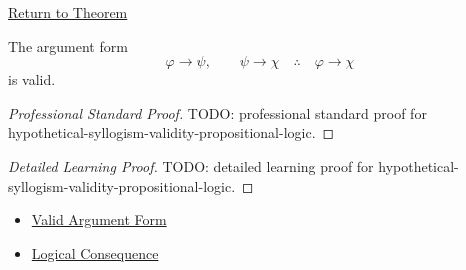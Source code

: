 \newpage
{}
\label{prf:hypothetical-syllogism-validity-propositional-logic}

\begin{remark*}[Return]
\hyperref[thm:hypothetical-syllogism-validity-propositional-logic]{Return to Theorem}
\end{remark*}

\begin{theorem*}
The argument form
\[
\varphi\to\psi,\qquad \psi\to\chi \quad\therefore\quad \varphi\to\chi
\]
is valid.
\end{theorem*}

\begin{proof}[Professional Standard Proof]
\LRAProofBodyStart
TODO: professional standard proof for hypothetical-syllogism-validity-propositional-logic.
\end{proof}

\begin{proof}[Detailed Learning Proof]
\LRAProofBodyStart
TODO: detailed learning proof for hypothetical-syllogism-validity-propositional-logic.
\end{proof}

\begin{remark*}
\end{remark*}

\begin{dependencies}
\begin{itemize}
  \item \hyperref[def:valid-argument-form-propositional-logic]{Valid Argument Form}
  \item \hyperref[def:logical-consequence-propositional-logic]{Logical Consequence}
\end{itemize}
\end{dependencies}

\clearpage
